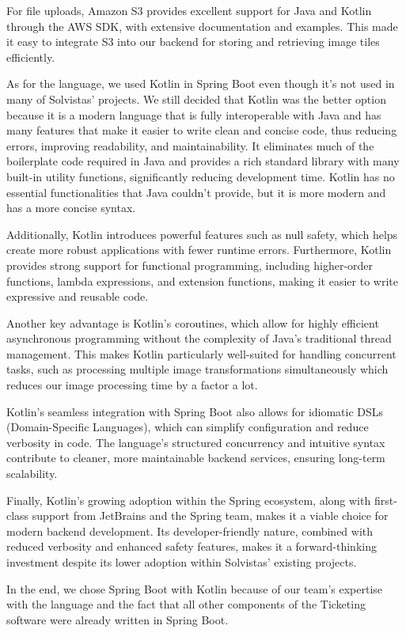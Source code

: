 For file uploads, Amazon S3 provides excellent support for Java and Kotlin through the AWS SDK, with extensive documentation and examples. This made it easy to integrate S3 into our backend for storing and retrieving image tiles efficiently.

As for the language, we used Kotlin in Spring Boot even though it’s not used in many of Solvistas’ projects. We still decided that Kotlin was the better option because it is a modern language that is fully interoperable with Java and has many features that make it easier to write clean and concise code, thus reducing errors, improving readability, and maintainability. It eliminates much of the boilerplate code required in Java and provides a rich standard library with many built-in utility functions, significantly reducing development time. Kotlin has no essential functionalities that Java couldn’t provide, but it is more modern and has a more concise syntax.

Additionally, Kotlin introduces powerful features such as null safety, which helps create more robust applications with fewer runtime errors. Furthermore, Kotlin provides strong support for functional programming, including higher-order functions, lambda expressions, and extension functions, making it easier to write expressive and reusable code.

Another key advantage is Kotlin’s coroutines, which allow for highly efficient asynchronous programming without the complexity of Java’s traditional thread management. This makes Kotlin particularly well-suited for handling concurrent tasks, such as processing multiple image transformations simultaneously which reduces our image processing time by a factor a lot.

Kotlin’s seamless integration with Spring Boot also allows for idiomatic DSLs (Domain-Specific Languages), which can simplify configuration and reduce verbosity in code. The language’s structured concurrency and intuitive syntax contribute to cleaner, more maintainable backend services, ensuring long-term scalability.

Finally, Kotlin’s growing adoption within the Spring ecosystem, along with first-class support from JetBrains and the Spring team, makes it a viable choice for modern backend development. Its developer-friendly nature, combined with reduced verbosity and enhanced safety features, makes it a forward-thinking investment despite its lower adoption within Solvistas’ existing projects.

In the end, we chose Spring Boot with Kotlin because of our team’s expertise with the language and the fact that all other components of the Ticketing software were already written in Spring Boot.

